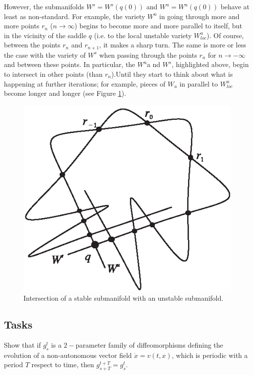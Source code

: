 However, the submanifolds $W^{s}=W^{s}(q(0))$ and $W^{u}=W^{u}(q(0))$ behave at least as non-standard. For example, the variety $W^{u}$ in going through more and more points $r_{n}$ ($n\to \infty$) begins to become more and more parallel to itself, but in the vicinity of the saddle $q$ (i.e. to the local unstable variety $W_{loc}^{u}$). Of course, between the points $r_{n}$ and $r_{n+1}$, it makes a sharp turn. The same is more or less the case with the variety of $W^{s}$ when passing through the points $r_{n}$ for $n\to  -\infty $ and between these points. In particular, the $W^{u}$a nd $W^{s}$, highlighted above, begin to intersect in other points (than $r_{n}$).Until they start to think about what is happening at further iterations; for example, pieces of $W_{u}$ in parallel to $W_{loc}^{u}$ become longer and longer (see Figure \ref{fig:5.8}).
\begin{figure}[!ht]
	\centering
	\includegraphics [scale=1.4]{jtr58}
	\caption{Intersection of a stable submanifold with an unstable submanifold.}
	\label{fig:5.8}
\end{figure}

\subsection*{Tasks}
\begin{task}
	Show that if $g_{s}^{t}$ is a $2-$parameter family of diffeomorphisms defining the evolution of a non-autonomous vector field $\dot{x}=v(t,x)$, which is periodic with a period $T$ respect to time, then $g_{s+T}^{t+T}=g_{s}^{t}$.
\end{task}


